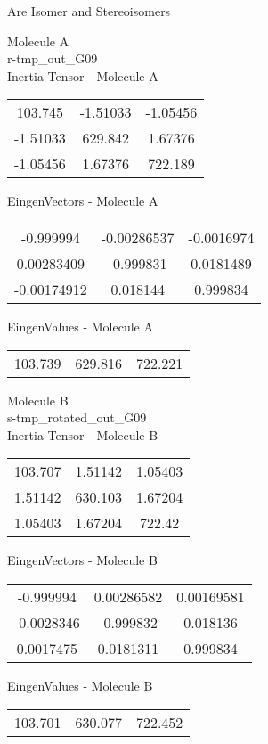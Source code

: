 \begin{center}
\vtab
\vtab
\textcolor{NavyBlue}{\Large Are Isomer and Stereoisomers}
\end{center}
\newpage
\begin{multicols}{2}
\begin{center}
Molecule A \\ 
r-tmp\_out\_G09
\\
Inertia Tensor - Molecule A \\
\vtab
\begin{tabular}{|c c c|}
103.745	 & 	-1.51033	 & 	-1.05456	 \\
-1.51033	 & 	629.842	 & 	1.67376	 \\
-1.05456	 & 	1.67376	 & 	722.189
\end{tabular}

\vtab
 EingenVectors - Molecule A     \\
\vtab
\begin{tabular}{|c c c|}
-0.999994	 & 	-0.00286537	 & 	-0.0016974	 \\
0.00283409	 & 	-0.999831	 & 	0.0181489	 \\
-0.00174912	 & 	0.018144	 & 	0.999834
\end{tabular}

\vtab
 EingenValues - Molecule A     \\
\vtab
\begin{tabular}{|c c c|}
103.739	 & 	629.816	 & 	722.221
\end{tabular}
\columnbreak

Molecule B \\ 
s-tmp\_rotated\_out\_G09
\\
Inertia Tensor - Molecule B \\
\vtab
\begin{tabular}{|c c c|}
103.707	 & 	1.51142	 & 	1.05403	 \\
1.51142	 & 	630.103	 & 	1.67204	 \\
1.05403	 & 	1.67204	 & 	722.42
\end{tabular}

\vtab
 EingenVectors - Molecule B     \\
\vtab
\begin{tabular}{|c c c|}
-0.999994	 & 	0.00286582	 & 	0.00169581	 \\
-0.0028346	 & 	-0.999832	 & 	0.018136	 \\
0.0017475	 & 	0.0181311	 & 	0.999834
\end{tabular}

\vtab
 EingenValues - Molecule B     \\
\vtab
\begin{tabular}{|c c c|}
103.701	 & 	630.077	 & 	722.452
\end{tabular}

\end{center}
\end{multicols}
